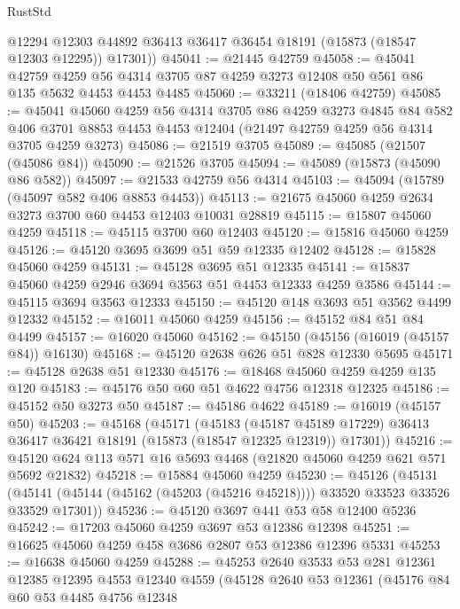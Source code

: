 \begin{lexlean}{RustStd}
\begin{coremodule}
        @12294
        @12303
        @44892
        @36413
        @36417
        @36454
        @18191
        (@15873 (@18547 @12303 @12295))
        @17301))
@45041 := @21445 @42759
@45058 := @45041
    @42759
    @4259
    @56
    @4314
    @3705
    @87
    @4259
    @3273
    @12408
    @50
    @561
    @86
    @135
    @5632
    @4453
    @4453
    @4485
@45060 := @33211 (@18406 @42759)
@45085 := @45041
    @45060
    @4259
    @56
    @4314
    @3705
    @86
    @4259
    @3273
    @4845
    @84
    @582
    @406
    @3701
    @8853
    @4453
    @4453
    @12404
    (@21497 @42759 @4259 @56 @4314 @3705 @4259 @3273)
@45086 := @21519 @3705
@45089 := @45085 (@21507 (@45086 @84))
@45090 := @21526 @3705
@45094 := @45089 (@15873 (@45090 @86 @582))
@45097 := @21533 @42759 @56 @4314
@45103 := @45094 (@15789 (@45097 @582 @406 @8853 @4453))
@45113 := @21675 @45060 @4259 @2634 @3273 @3700 @60 @4453 @12403 @10031 @28819
@45115 := @15807 @45060 @4259
@45118 := @45115 @3700 @60 @12403
@45120 := @15816 @45060 @4259
@45126 := @45120 @3695 @3699 @51 @59 @12335 @12402
@45128 := @15828 @45060 @4259
@45131 := @45128 @3695 @51 @12335
@45141 := @15837 @45060 @4259 @2946 @3694 @3563 @51 @4453 @12333 @4259 @3586
@45144 := @45115 @3694 @3563 @12333
@45150 := @45120 @148 @3693 @51 @3562 @4499 @12332
@45152 := @16011 @45060 @4259
@45156 := @45152 @84 @51 @84 @4499
@45157 := @16020 @45060
@45162 := @45150 (@45156 (@16019 (@45157 @84)) @16130)
@45168 := @45120 @2638 @626 @51 @828 @12330 @5695
@45171 := @45128 @2638 @51 @12330
@45176 := @18468 @45060 @4259 @4259 @135 @120
@45183 := @45176 @50 @60 @51 @4622 @4756 @12318 @12325
@45186 := @45152 @50 @3273 @50
@45187 := @45186 @4622
@45189 := @16019 (@45157 @50)
@45203 := @45168
    (@45171
      (@45183
        (@45187 @45189 @17229)
        @36413
        @36417
        @36421
        @18191
        (@15873 (@18547 @12325 @12319))
        @17301))
@45216 := @45120 @624 @113 @571 @16 @5693 @4468 (@21820 @45060 @4259 @621 @571 @5692 @21832)
@45218 := @15884 @45060 @4259
@45230 := @45126
    (@45131 (@45141 (@45144 (@45162 (@45203 (@45216 @45218)))) @33520 @33523 @33526 @33529 @17301))
@45236 := @45120 @3697 @441 @53 @58 @12400 @5236
@45242 := @17203 @45060 @4259 @3697 @53 @12386 @12398
@45251 := @16625 @45060 @4259 @458 @3686 @2807 @53 @12386 @12396 @5331
@45253 := @16638 @45060 @4259
@45288 := @45253
    @2640
    @3533
    @53
    @281
    @12361
    @12385
    @12395
    @4553
    @12340
    @4559
    (@45128
      @2640
      @53
      @12361
      (@45176
        @84
        @60
        @53
        @4485
        @4756
        @12348

\end{coremodule}
\end{lexlean}
